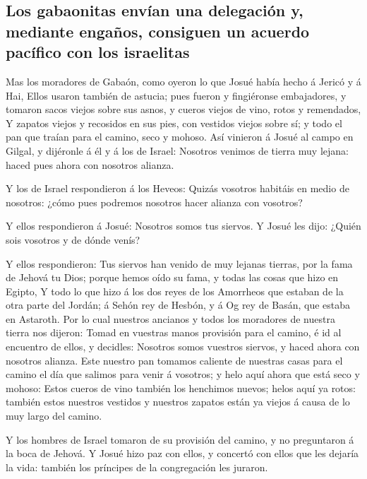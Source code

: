 \hypertarget{los-gabaonitas-envuxedan-una-delegaciuxf3n-y-mediante-engauxf1os-consiguen-un-acuerdo-pacuxedfico-con-los-israelitas}{%
\subsection{Los gabaonitas envían una delegación y, mediante engaños,
consiguen un acuerdo pacífico con los
israelitas}\label{los-gabaonitas-envuxedan-una-delegaciuxf3n-y-mediante-engauxf1os-consiguen-un-acuerdo-pacuxedfico-con-los-israelitas}}

 Mas los moradores de Gabaón, como oyeron lo que Josué
había hecho á Jericó y á Hai,  Ellos usaron también de
astucia; pues fueron y fingiéronse embajadores, y tomaron sacos viejos
sobre sus asnos, y cueros viejos de vino, rotos y remendados,
 Y zapatos viejos y recosidos en sus pies, con vestidos
viejos sobre sí; y todo el pan que traían para el camino, seco y mohoso.
 Así vinieron á Josué al campo en Gilgal, y dijéronle á él
y á los de Israel: Nosotros venimos de tierra muy lejana: haced pues
ahora con nosotros alianza.

 Y los de Israel respondieron á los Heveos: Quizás
vosotros habitáis en medio de nosotros: ¿cómo pues podremos nosotros
hacer alianza con vosotros?

 Y ellos respondieron á Josué: Nosotros somos tus siervos.
Y Josué les dijo: ¿Quién sois vosotros y de dónde venís?

 Y ellos respondieron: Tus siervos han venido de muy
lejanas tierras, por la fama de Jehová tu Dios; porque hemos oído su
fama, y todas las cosas que hizo en Egipto,  Y todo lo
que hizo á los dos reyes de los Amorrheos que estaban de la otra parte
del Jordán; á Sehón rey de Hesbón, y á Og rey de Basán, que estaba en
Astaroth.  Por lo cual nuestros ancianos y todos los
moradores de nuestra tierra nos dijeron: Tomad en vuestras manos
provisión para el camino, é id al encuentro de ellos, y decidles:
Nosotros somos vuestros siervos, y haced ahora con nosotros alianza.
 Este nuestro pan tomamos caliente de nuestras casas para
el camino el día que salimos para venir á vosotros; y helo aquí ahora
que está seco y mohoso:  Estos cueros de vino también los
henchimos nuevos; helos aquí ya rotos: también estos nuestros vestidos y
nuestros zapatos están ya viejos á causa de lo muy largo del camino.

 Y los hombres de Israel tomaron de su provisión del
camino, y no preguntaron á la boca de Jehová.  Y Josué
hizo paz con ellos, y concertó con ellos que les dejaría la vida:
también los príncipes de la congregación les juraron.

